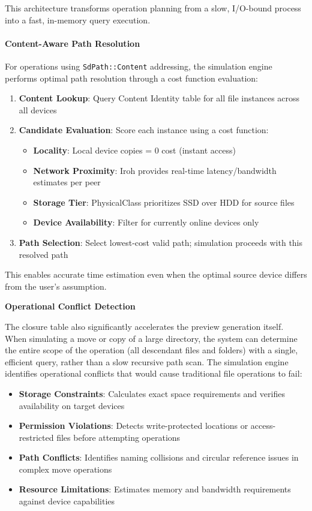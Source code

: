 \documentclass[sigconf]{acmart}
\begin{document}
This architecture transforms operation planning from a slow, I/O-bound process into a fast, in-memory query execution.

\paragraph{Content-Aware Path Resolution}

For operations using \texttt{SdPath::Content} addressing, the simulation engine performs optimal path resolution through a cost function evaluation:

\begin{enumerate}[noitemsep, topsep=0pt]
 \item \textbf{Content Lookup}: Query Content Identity table for all file instances across all devices
 \item \textbf{Candidate Evaluation}: Score each instance using a cost function:
   \begin{itemize}[noitemsep]
     \item \textbf{Locality}: Local device copies = 0 cost (instant access)
     \item \textbf{Network Proximity}: Iroh provides real-time latency/bandwidth estimates per peer
     \item \textbf{Storage Tier}: PhysicalClass prioritizes SSD over HDD for source files
     \item \textbf{Device Availability}: Filter for currently online devices only
   \end{itemize}
 \item \textbf{Path Selection}: Select lowest-cost valid path; simulation proceeds with this resolved path
\end{enumerate}

This enables accurate time estimation even when the optimal source device differs from the user's assumption.

\textbf{Operational Conflict Detection}

The closure table also significantly accelerates the preview generation itself. When simulating a move or copy of a large directory, the system can determine the entire scope of the operation (all descendant files and folders) with a single, efficient query, rather than a slow recursive path scan. The simulation engine identifies operational conflicts that would cause traditional file operations to fail:
\begin{itemize}[noitemsep, topsep=0pt]
\item \textbf{Storage Constraints}: Calculates exact space requirements and verifies availability on target devices
\item \textbf{Permission Violations}: Detects write-protected locations or access-restricted files before attempting operations
\item \textbf{Path Conflicts}: Identifies naming collisions and circular reference issues in complex move operations
\item \textbf{Resource Limitations}: Estimates memory and bandwidth requirements against device capabilities
\end{itemize}
\end{document}
